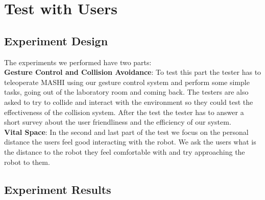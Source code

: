 \section{Test with Users}
\label{sec:test}

\subsection{Experiment Design}
The experiments we performed have two parts:\\

\textbf{Gesture Control and Collision Avoidance}: To test this part the tester has to teleoperate MASHI using our gesture control system and perform some simple tasks, going out of the laboratory room and coming back. The testers are also asked to try to collide and interact with the environment so they could test the effectiveness of the collision system. After the test the tester has to answer a short survey about the user friendliness and the efficiency of our system. \\ 

\textbf{Vital Space}: In the second and last part of the test we focus on the personal distance the users feel good interacting with the robot. We ask the users what is the distance to the robot they feel comfortable with and try approaching the robot to them.\\


\subsection{Experiment Results}
